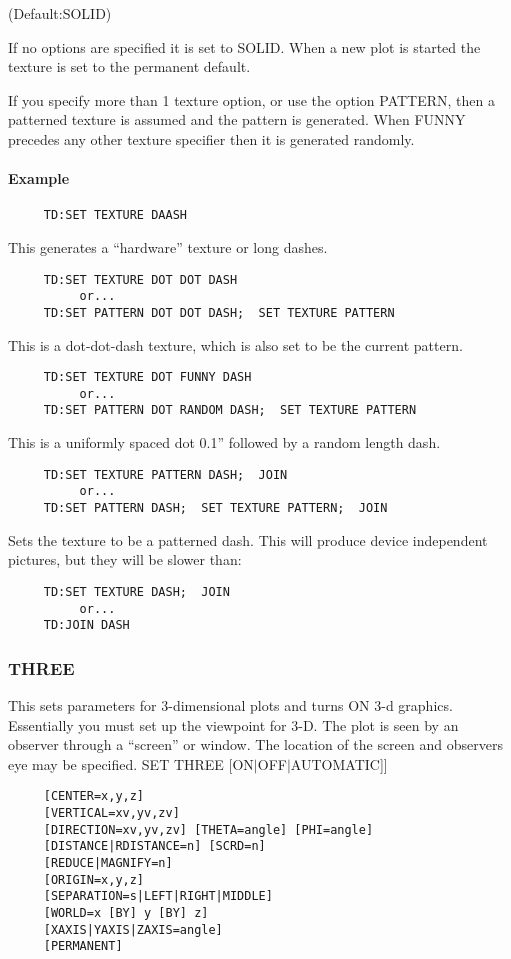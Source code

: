 (Default:SOLID) 

If  no  options  are  specified it is set to SOLID.  When a new plot is
started the texture is set to the permanent default.  

If  you  specify more than 1 texture option, or use the option PATTERN,
then a patterned texture is assumed and the pattern is generated.  When
FUNNY  precedes  any  other  texture  specifier  then  it  is generated
randomly.  
\paragraph{Example}
\begin{verbatim}
     TD:SET TEXTURE DAASH 
\end{verbatim}
This generates a ``hardware'' texture or long dashes.  
\begin{verbatim}
     TD:SET TEXTURE DOT DOT DASH 
          or...  
     TD:SET PATTERN DOT DOT DASH;  SET TEXTURE PATTERN 
\end{verbatim}
This  is  a dot-dot-dash texture, which is also set to be the current
pattern.  
\begin{verbatim}
     TD:SET TEXTURE DOT FUNNY DASH 
          or...  
     TD:SET PATTERN DOT RANDOM DASH;  SET TEXTURE PATTERN 
\end{verbatim}
This is a uniformly spaced dot 0.1'' followed by a random length dash. 
\begin{verbatim}
     TD:SET TEXTURE PATTERN DASH;  JOIN 
          or...  
     TD:SET PATTERN DASH;  SET TEXTURE PATTERN;  JOIN 
\end{verbatim}
Sets  the  texture  to be a patterned dash.  This will produce device
independent pictures, but they will be slower than:  
\begin{verbatim}
     TD:SET TEXTURE DASH;  JOIN 
          or...  
     TD:JOIN DASH 
\end{verbatim}
\subsubsection{THREE}
This sets parameters for 3-dimensional plots and turns ON 3-d graphics.
Essentially you must set up the viewpoint for 3-D.  The plot is seen by
an  observer  through a ``screen'' or window.  The location of the screen
and observers eye may be specified.  
SET THREE [ON$|$OFF$|$AUTOMATIC]] 
\begin{verbatim}
     [CENTER=x,y,z] 
     [VERTICAL=xv,yv,zv] 
     [DIRECTION=xv,yv,zv] [THETA=angle] [PHI=angle] 
     [DISTANCE|RDISTANCE=n] [SCRD=n] 
     [REDUCE|MAGNIFY=n] 
     [ORIGIN=x,y,z] 
     [SEPARATION=s|LEFT|RIGHT|MIDDLE] 
     [WORLD=x [BY] y [BY] z] 
     [XAXIS|YAXIS|ZAXIS=angle] 
     [PERMANENT] 
\end{verbatim}

